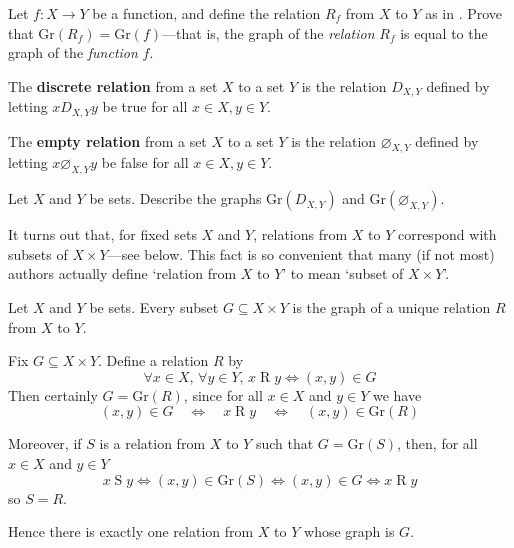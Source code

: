 \begin{exercise}
Let $f : X \to Y$ be a function, and define the relation $R_f$ from $X$ to $Y$ as in . Prove that $\mathrm{Gr}(R_f) = \mathrm{Gr}(f)$---that is, the graph of the \textit{relation} $R_f$ is equal to the graph of the \textit{function} $f$.
\end{exercise}

\begin{definition}
\label{defEmptyRelation}
\label{defDiscreteRelation}
The \textbf{discrete relation} from a set $X$ to a set $Y$ is the relation $D_{X,Y}$ defined by letting $x \mathrel{D_{X,Y}} y$ be true for all $x \in X, y \in Y$.

The \textbf{empty relation} from a set $X$ to a set $Y$ is the relation $\varnothing_{X,Y}$  defined by letting $x \mathrel{\varnothing_{X,Y}} y$ be false for all $x \in X, y \in Y$.
\end{definition}

\begin{exercise}
\label{exGraphOfEmptyAndDiscreteRelations}
Let $X$ and $Y$ be sets. Describe the graphs $\mathrm{Gr}(D_{X,Y})$ and $\mathrm{Gr}(\varnothing_{X,Y})$.
\end{exercise}

It turns out that, for fixed sets $X$ and $Y$, relations from $X$ to $Y$ correspond with subsets of $X \times Y$---see  below. This fact is so convenient that many (if not most) authors actually define `relation from $X$ to $Y$' to mean `subset of $X \times Y$'.

\begin{theorem}
\label{thmRelationsAsSubsets}
Let $X$ and $Y$ be sets. Every subset $G \subseteq X \times Y$ is the graph of a unique relation $R$ from $X$ to $Y$.
\end{theorem}
\begin{cproof}
Fix $G \subseteq X \times Y$. Define a relation $R$ by
\[ \forall x \in X,\, \forall y \in Y,\, x \mathbin{R} y \Leftrightarrow (x,y) \in G \]
Then certainly $G = \mathrm{Gr}(R)$, since for all $x \in X$ and $y \in Y$ we have
\[ (x,y) \in G \quad \Leftrightarrow \quad x \mathrel{R} y \quad \Leftrightarrow \quad (x,y) \in \mathrm{Gr}(R) \]

Moreover, if $S$ is a relation from $X$ to $Y$ such that $G=\mathrm{Gr}(S)$, then, for all $x \in X$ and $y \in Y$ 
\[ x \mathrel{S} y \Leftrightarrow (x,y) \in \mathrm{Gr}(S) \Leftrightarrow (x,y) \in G \Leftrightarrow x \mathrel{R} y \]
so $S=R$.

Hence there is exactly one relation from $X$ to $Y$ whose graph is $G$.
\end{cproof}

